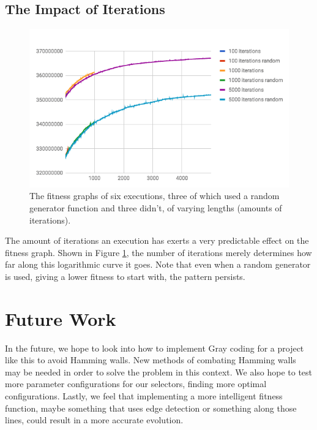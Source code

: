\subsection{The Impact of Iterations}
\begin{figure}
    \centering
    \includegraphics[width=0.8\linewidth]{randomIter.png}
    \caption[Fitness graph of multiple executions with varying amounts of iterations]{The fitness graphs of six executions, three of which used a random generator function and three didn't, of varying lengths (amounts of iterations).}
    \label{fig:iterationtests}
\end{figure}

The amount of iterations an execution has exerts a very predictable effect on the fitness graph. Shown in Figure \ref{fig:iterationtests}, the number of iterations merely determines how far along this logarithmic curve it goes. Note that even when a random generator is used, giving a lower fitness to start with, the pattern persists. 



\section{Future Work}
In the future, we hope to look into how to implement Gray coding for a project like this to avoid Hamming walls. New methods of combating Hamming walls may be needed in order to solve the problem in this context. We also hope to test more parameter configurations for our selectors, finding more optimal configurations. Lastly, we feel that implementing a more intelligent fitness function, maybe something that uses edge detection or something along those lines, could result in a more accurate evolution.
